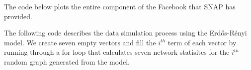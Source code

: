 \documentclass[12pt,twoside]{amherstthesis}
\begin{document}
  The code below plots the entire component of the Facebook that SNAP has
  provided.
  
  \begin{Shaded}
  \begin{Highlighting}[]
        \NormalTok{, }
        \NormalTok{, }
        \NormalTok{, }
        \NormalTok{)}
  \end{Highlighting}
  \end{Shaded}
  
  The following code describes the data simulation process using the
  Erdős-Rényi model. We create seven empty vectors and fill the \(i^{th}\)
  term of each vector by running through a for loop that calculates seven
  network statisitcs for the \(i^{th}\) random graph generated from the
  model.
  
\end{document}
